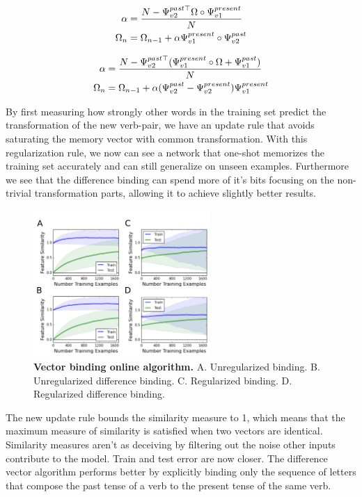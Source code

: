 \documentclass{article}
\begin{document}
\begin{align}
\label{eq:regularization_vec}
\notag \alpha &= \frac{N-\Psi^{past\top}_{v2} \Omega \circ \Psi^{present}_{v1}}{N}  \\
\Omega_n &= \Omega_{n-1} + \alpha \Psi^{present}_{v1} \circ \Psi^{past}_{v2}
\end{align}

\begin{align}
\label{eq:regularization_difference_vec}
\notag \alpha &= \frac{N-
\Psi^{past\top}_{v2} (\Psi^{present}_{v1} \circ \Omega+
\Psi^{past}_{v1})}{N} \\
\Omega_n &= \Omega_{n-1} + \alpha
(\Psi^{past}_{v2} - \Psi^{present}_{v2})
\Psi^{present}_{v1}
\end{align}

By first measuring how strongly other words in the training set predict the transformation of the new verb-pair, we have an update rule that avoids saturating the memory vector with common transformation. With this regularization rule, we now can see a network that one-shot memorizes the training set accurately and can still generalize on unseen examples. Furthermore we see that the difference binding can spend more of it's bits focusing on the non-trivial transformation parts, allowing it to achieve slightly better results.


\begin{figure}[h]
\centering
\includegraphics[width=0.6\textwidth]{vector_binding_algorithm-170518.png}
\caption{\textbf{Vector binding online algorithm.} A. Unregularized binding. B. Unregularized difference binding. C. Regularized binding. D. Regularized difference binding.}
\end{figure}

The new update rule bounds the similarity measure to 1, which means that the maximum measure of similarity is satisfied when two vectors are identical. Similarity measures aren't as deceiving by filtering out the noise other inputs contribute to the model. Train and test error are now closer. The difference vector algorithm performs better by explicitly binding only the sequence of letters that compose the past tense of a verb to the present tense of the same verb. 
\end{document}
